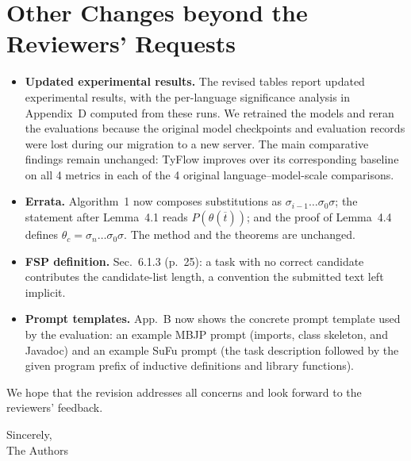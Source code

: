 \documentclass[11pt,a4paper]{article}
\begin{document}
\clearpage
\section*{Other Changes beyond the Reviewers' Requests}

\begin{itemize}[leftmargin=1.2em,itemsep=2pt,topsep=3pt]
  \item \textbf{Updated experimental results.} The revised tables report updated experimental results, with the per-language significance analysis in Appendix~D computed from these runs. We retrained the models and reran the evaluations because the original model checkpoints and evaluation records were lost during our migration to a new server. The main comparative findings remain unchanged: TyFlow improves over its corresponding baseline on all 4 metrics in each of the 4 original language--model-scale comparisons.
  \item \textbf{Errata.} Algorithm~1 now composes substitutions as $\sigma_{i-1}\ldots\sigma_0\sigma$; the statement after Lemma~4.1 reads $P(\theta(\overline{t}))$; and the proof of Lemma~4.4 defines $\theta_c=\sigma_n\ldots\sigma_0\sigma$. The method and the theorems are unchanged.
  \item \textbf{FSP definition.} Sec.~6.1.3 (p.~25): a task with no correct candidate contributes the candidate-list length, a convention the submitted text left implicit.
  \item \textbf{Prompt templates.} App.~B now shows the concrete prompt template used by the evaluation: an example MBJP prompt (imports, class skeleton, and Javadoc) and an example SuFu prompt (the task description followed by the given program prefix of inductive definitions and library functions).
\end{itemize}

\medskip We hope that the revision addresses all concerns and look forward to the reviewers' feedback.

\bigskip
Sincerely,\\
The Authors
\end{document}
